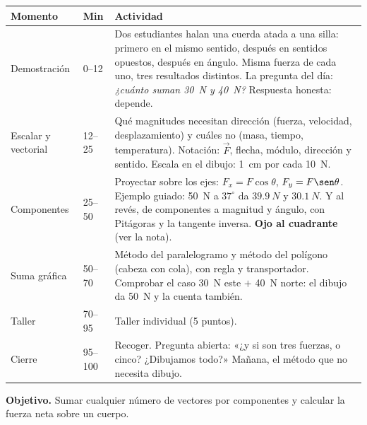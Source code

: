 \documentclass[11pt]{article}
\begin{document}
\begin{center}
{\renewcommand{\arraystretch}{1.3}
\begin{tabularx}{\linewidth}{@{}l l X@{}}
  \toprule
  \textbf{Momento} & \textbf{Min} & \textbf{Actividad}\\
  \midrule
  Demostración & 0--12 & Dos estudiantes halan una cuerda atada a una silla: primero en el
    mismo sentido, después en sentidos opuestos, después en ángulo. Misma fuerza de cada
    uno, tres resultados distintos. La pregunta del día: \emph{¿cuánto suman \qty{30}{N} y
    \qty{40}{N}?} Respuesta honesta: depende.\\
  Escalar y vectorial & 12--25 & Qué magnitudes necesitan dirección (fuerza, velocidad,
    desplazamiento) y cuáles no (masa, tiempo, temperatura). Notación: $\vec{F}$, flecha,
    módulo, dirección y sentido. Escala en el dibujo: \qty{1}{cm} por cada \qty{10}{N}.\\
  Componentes & 25--50 & Proyectar sobre los ejes: $F_x = F\cos\theta$, $F_y = F\sen\theta$.
    Ejemplo guiado: \qty{50}{N} a $37^\circ$ da $\qty{39,9}{N}$ y $\qty{30,1}{N}$.
    Y al revés, de componentes a magnitud y ángulo, con Pitágoras y la tangente inversa.
    \textbf{Ojo al cuadrante} (ver la nota).\\
  Suma gráfica & 50--70 & Método del paralelogramo y método del polígono (cabeza con cola),
    con regla y transportador. Comprobar el caso \qty{30}{N} este $+$ \qty{40}{N} norte:
    el dibujo da \qty{50}{N} y la cuenta también.\\
  Taller & 70--95 & Taller individual (5 puntos).\\
  Cierre & 95--100 & Recoger. Pregunta abierta: «¿y si son tres fuerzas, o cinco?
    ¿Dibujamos todo?» Mañana, el método que no necesita dibujo.\\
  \bottomrule
\end{tabularx}}
\end{center}


\textbf{Objetivo.} Sumar cualquier número de vectores por componentes y calcular la fuerza
neta sobre un cuerpo.
\end{document}
